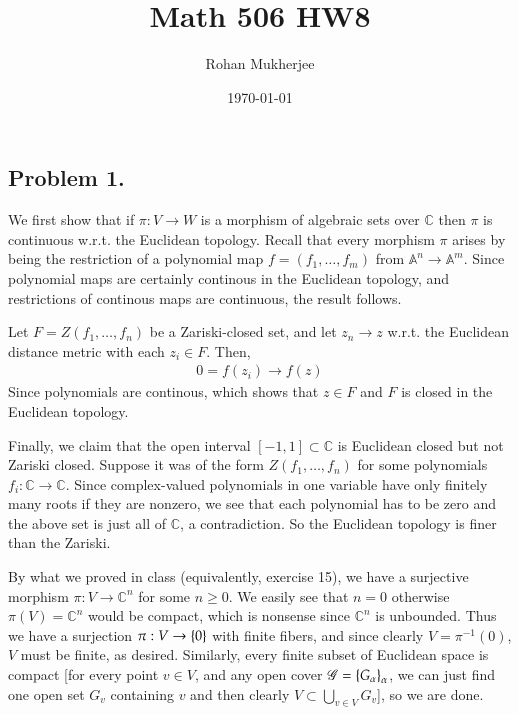 \documentclass[12pt]{article}
\title{Math 506 HW8}
\date{\today}
\author{Rohan Mukherjee}
\theoremstyle{definitionstyle}
\def\mbb#1{\mathbb{#1}}
\def\C{\mbb{C}}
\newcommand{\SET}[1]{\Set{\mskip-\medmuskip #1 \mskip-\medmuskip}}
\newcommand{\A}{\mathbb{A}}
\begin{document}
    \maketitle
    \subsection*{Problem 1.}
    We first show that if $\pi: V \to W$ is a morphism of algebraic sets over $\C$ then $\pi$ is continuous w.r.t. the Euclidean topology. Recall that every morphism $\pi$ arises by being the restriction of a polynomial map $f = (f_1, \ldots, f_m)$ from $\A^n \to \A^m$. Since polynomial maps are certainly continous in the Euclidean topology, and restrictions of continous maps are continuous, the result follows. 

    Let $F = Z(f_1, \ldots, f_n)$ be a Zariski-closed set, and let $z_n \to z$ w.r.t. the Euclidean distance metric with each $z_i \in F$. Then,
    \begin{align*}
        0 = f(z_i) \to f(z)
    \end{align*}
    Since polynomials are continous, which shows that $z \in F$ and $F$ is closed in the Euclidean topology. 

    Finally, we claim that the open interval $[-1,1] \subset \C$ is Euclidean closed but not Zariski closed. Suppose it was of the form $Z(f_1, \ldots, f_n)$ for some polynomials $f_i: \C \to \C$. Since complex-valued polynomials in one variable have only finitely many roots if they are nonzero, we see that each polynomial has to be zero and the above set is just all of $\C$, a contradiction. So the Euclidean topology is finer than the Zariski.

    By what we proved in class (equivalently, exercise 15), we have a surjective morphism $\pi: V \to \C^n$ for some $n \geq 0$. We easily see that $n = 0$ otherwise $\pi(V) = \C^n$ would be compact, which is nonsense since $\C^n$ is unbounded. Thus we have a surjection $\pi: V \to \SET{0}$ with finite fibers, and since clearly $V = \pi^{-1}(0)$, $V$ must be finite, as desired. Similarly, every finite subset of Euclidean space is compact [for every point $v \in V$, and any open cover $\mathscr{G} = \SET{G_\alpha}_{\alpha}$, we can just find one open set $G_v$ containing $v$ and then clearly $V \subset \bigcup_{v\in V} G_v$], so we are done.
\end{document}
